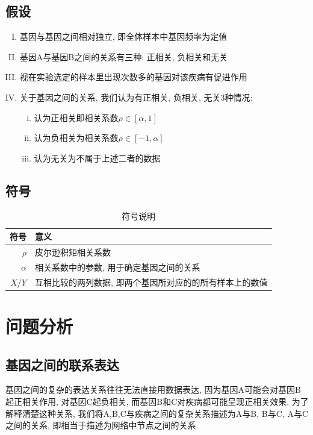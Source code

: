 \documentclass[zihao=-4]{ctexart}
\begin{document}
\subsection{假设}

\begin{enumerate}[I.]
    \item 基因与基因之间相对独立, 即全体样本中基因频率为定值
    \item 基因A与基因B之间的关系有三种: 正相关, 负相关和无关
    \item 视在实验选定的样本里出现次数多的基因对该疾病有促进作用
    \item 关于基因之间的关系, 我们认为有正相关, 负相关, 无关3种情况:
    \begin{enumerate}[i.]
        \item 认为正相关即相关系数$\rho \in [\alpha, 1]$
        \item 认为负相关为相关系数$\rho \in [-1,\alpha]$
        \item 认为无关为不属于上述二者的数据
    \end{enumerate}
\end{enumerate}

\subsection{符号}
\begin{table}[H]
    \centering
    \caption{符号说明}
    \begin{tabular}{r|l}
        \hline
        符号 & 意义\\
        \hline
        $\rho$ & 皮尔逊积矩相关系数\\
        $\alpha$ & 相关系数中的参数, 用于确定基因之间的关系\\
        $X/Y$ & 互相比较的两列数据, 即两个基因所对应的的所有样本上的数值\\
        \hline
    \end{tabular}
\end{table}



\section{问题分析}
\subsection{基因之间的联系表达}
基因之间的复杂的表达关系往往无法直接用数据表达, 因为基因A可能会对基因B起正相关作用, 对基因C起负相关, 而基因B和C对疾病都可能呈现正相关效果. 为了解释清楚这种关系, 我们将A,B,C与疾病之间的复杂关系描述为A与B, B与C, A与C之间的关系, 即相当于描述为网络中节点之间的关系.
\end{document}
